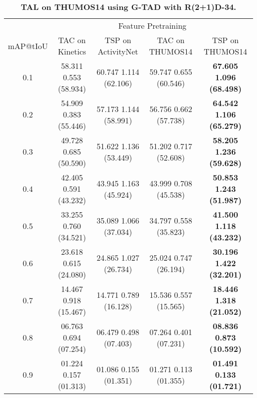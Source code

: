 \documentclass[10pt,twocolumn,letterpaper]{article}
\begin{document}
\begin{table*}[t]
\begin{subtable}{\linewidth}
    \centering
    \vspace{5pt}
    \caption{\bf TAL on THUMOS14 using G-TAD with R(2+1)D-34.}
    \vspace{-5pt}
    \begin{tabular}{c|cc|cc}
    \toprule 
            & \multicolumn{4}{c}{Feature Pretraining} \\ 
    mAP@tIoU& TAC on Kinetics                           & TSP on ActivityNet                        & TAC on THUMOS14                           & TSP on THUMOS14 \\ \midrule
    0.1     & 58.311 {\scriptsize  0.553} (58.934) & 60.747 {\scriptsize  1.114} (62.106) & 59.747 {\scriptsize  0.655} (60.546) &\bf 67.605 {\scriptsize  1.096} (68.498) \\
    0.2     & 54.909 {\scriptsize  0.383} (55.446) & 57.173 {\scriptsize  1.144} (58.991) & 56.756 {\scriptsize  0.662} (57.738) &\bf 64.542 {\scriptsize  1.106} (65.279) \\
    0.3     & 49.728 {\scriptsize  0.685} (50.590) & 51.622 {\scriptsize  1.136} (53.449) & 51.202 {\scriptsize  0.717} (52.608) &\bf 58.205 {\scriptsize  1.236} (59.628) \\
    0.4     & 42.405 {\scriptsize  0.591} (43.232) & 43.945 {\scriptsize  1.163} (45.924) & 43.999 {\scriptsize  0.708} (45.538) &\bf 50.853 {\scriptsize  1.243} (51.987) \\
\rowcolor{Gray}
    0.5     & 33.255 {\scriptsize  0.760} (34.521) & 35.089 {\scriptsize  1.066} (37.034) & 34.797 {\scriptsize  0.558} (35.823) &\bf 41.500 {\scriptsize  1.118} (43.232) \\
    0.6     & 23.618 {\scriptsize  0.615} (24.080) & 24.865 {\scriptsize  1.027} (26.734) & 25.024 {\scriptsize  0.747} (26.194) &\bf 30.196 {\scriptsize  1.422} (32.201) \\
    0.7     & 14.467 {\scriptsize  0.918} (15.467) & 14.771 {\scriptsize  0.789} (16.128) & 15.536 {\scriptsize  0.557} (15.565) &\bf 18.446 {\scriptsize  1.318} (21.052) \\
    0.8     & 06.763 {\scriptsize  0.694} (07.254) & 06.479 {\scriptsize  0.498} (07.403) & 07.264 {\scriptsize  0.401} (07.231) &\bf 08.836 {\scriptsize  0.873} (10.592) \\
    0.9     & 01.224 {\scriptsize  0.157} (01.313) & 01.086 {\scriptsize  0.155} (01.351) & 01.271 {\scriptsize  0.113} (01.355) &\bf 01.491 {\scriptsize  0.133} (01.721) \\
    \bottomrule
    \end{tabular}
\end{subtable}

\end{table*}
\end{document}
